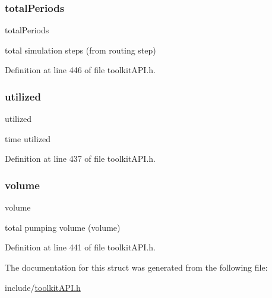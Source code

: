 \subsubsection{\texorpdfstring{totalPeriods}{totalPeriods}}
{\footnotesize\ttfamily total\+Periods}

total simulation steps (from routing step) 

Definition at line 446 of file toolkit\+A\+P\+I.\+h.

\mbox{\label{struct_s_m___pump_stats_a200b170f07df6efeaa5aad98ef34a488}} 
\subsubsection{\texorpdfstring{utilized}{utilized}}
{\footnotesize\ttfamily utilized}

time utilized 

Definition at line 437 of file toolkit\+A\+P\+I.\+h.

\mbox{\label{struct_s_m___pump_stats_a9bc498ccac8db41438f855f5dd3f4c05}} 
\subsubsection{\texorpdfstring{volume}{volume}}
{\footnotesize\ttfamily volume}

total pumping volume (volume) 

Definition at line 441 of file toolkit\+A\+P\+I.\+h.



The documentation for this struct was generated from the following file\+:\begin{DoxyCompactItemize}
\item 
include/\mbox{\hyperlink{toolkit_a_p_i_8h}{toolkit\+A\+P\+I.\+h}}\end{DoxyCompactItemize}
